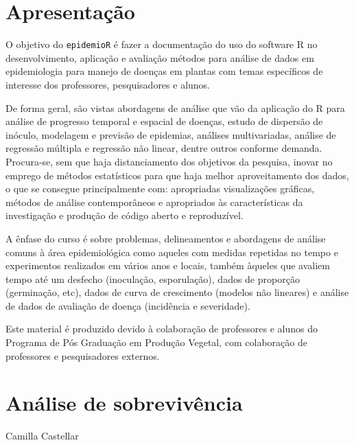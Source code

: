 \documentclass[a4paper,]{book}
\begin{document}
{
\hypersetup{linkcolor=black}
\setcounter{tocdepth}{1}
\tableofcontents
}
\chapter*{Apresentação}\label{apresentacao}

O objetivo do \texttt{epidemioR} é fazer a documentação do uso do
software R no desenvolvimento, aplicação e avaliação métodos para
análise de dados em epidemiologia para manejo de doenças em plantas com
temas específicos de interesse dos professores, pesquisadores e alunos.

De forma geral, são vistas abordagens de análise que vão da aplicação do
R para análise de progresso temporal e espacial de doenças, estudo de
dispersão de inóculo, modelagem e previsão de epidemias, análises
multivariadas, análise de regressão múltipla e regressão não linear,
dentre outros conforme demanda. Procura-se, sem que haja distanciamento
dos objetivos da pesquisa, inovar no emprego de métodos estatísticos
para que haja melhor aproveitamento dos dados, o que se consegue
principalmente com: apropriadas visualizações gráficas, métodos de
análise contemporâneos e apropriados às características da investigação
e produção de código aberto e reproduzível.

A ênfase do curso é sobre problemas, delineamentos e abordagens de
análise comuns à área epidemiológica como aqueles com medidas repetidas
no tempo e experimentos realizados em vários anos e locais, também
àqueles que avaliem tempo até um desfecho (inoculação, esporulação),
dados de proporção (germinação, etc), dados de curva de crescimento
(modelos não lineares) e análise de dados de avaliação de doença
(incidência e severidade).

Este material é produzido devido à colaboração de professores e alunos
do Programa de Pós Graduação em Produção Vegetal, com colaboração de
professores e pesquisadores externos.

\chapter{Análise de sobrevivência}\label{analise-de-sobrevivencia}

\pagestyle{fancy}

\begin{flushright}
Camilla Castellar
\end{flushright}

\vspace{2em}
\end{document}
